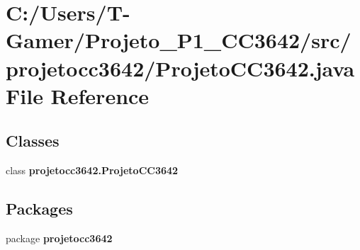 \section{C\+:/\+Users/\+T-\/\+Gamer/\+Projeto\+\_\+\+P1\+\_\+\+C\+C3642/src/projetocc3642/\+Projeto\+C\+C3642.java File Reference}
\label{_projeto_c_c3642_8java}
\subsection*{Classes}
\begin{DoxyCompactItemize}
\item 
class \textbf{ projetocc3642.\+Projeto\+C\+C3642}
\end{DoxyCompactItemize}
\subsection*{Packages}
\begin{DoxyCompactItemize}
\item 
package \textbf{ projetocc3642}
\end{DoxyCompactItemize}
